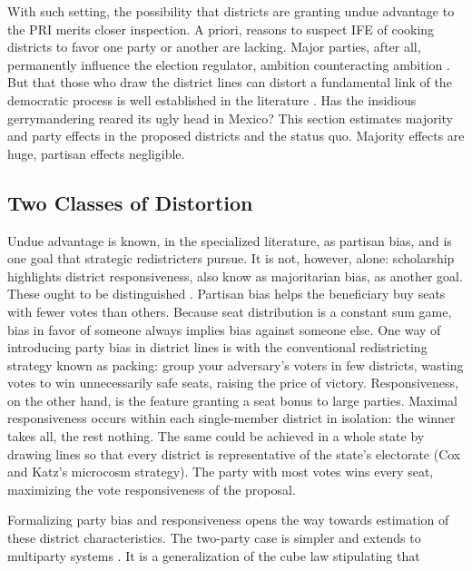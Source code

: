 \documentclass[letter,12pt]{article}
\begin{document}
With such setting, the possibility that districts are granting undue advantage to the PRI merits closer inspection. A priori, reasons to suspect IFE of cooking districts to favor one party or another are lacking. Major parties, after all, permanently influence the election regulator, ambition counteracting ambition \citep{estevez.magar.rosas.2008}. But that those who draw the district lines can distort a fundamental link of the democratic process is well established in the literature \citep{altman.mcdonald2011bard,cox.katz.2002,engstrom2006redisttrictApsr,rossiter.etal.1997,king.1990elRespBiasMultiparty,balinskiYoung2001FairRep,otero.2003}. Has the insidious gerrymandering reared its ugly head in Mexico? This section estimates majority and party effects in the proposed districts and the status quo. Majority effects are huge, partisan effects negligible. 

\subsection{Two Classes of Distortion}

Undue advantage is known, in the specialized literature, as partisan bias, and is one goal that strategic redistricters pursue. It is not, however, alone: scholarship highlights district responsiveness, also know as majoritarian bias, as another goal. These ought to be distinguished \citep[this paragraph draws heavily on][, ch.\ 3]{cox.katz.2002}. Partisan bias helps the beneficiary buy seats with fewer votes than others. Because seat distribution is a constant sum game, bias in favor of someone always implies bias against someone else. One way of introducing party bias in district lines is with the conventional redistricting strategy known as packing: group your adversary's voters in few districts, wasting votes to win unnecessarily safe seats, raising the price of victory. Responsiveness, on the other hand, is the feature granting a seat bonus to large parties. Maximal responsiveness occurs within each single-member district in isolation: the winner takes all, the rest nothing. The same could be achieved in a whole state by drawing lines so that every district is representative of the state's electorate (Cox and Katz's microcosm strategy). The party with most votes wins every seat, maximizing the vote responsiveness of the proposal. 

Formalizing party bias and responsiveness opens the way towards estimation of these district characteristics. The two-party case is simpler and extends to multiparty systems \citep{taagepera.CubeLaw.1973,tufte1973seatsVotes,king.browning1987biasRespUS}. It is a generalization of the cube law stipulating that 
\end{document}

